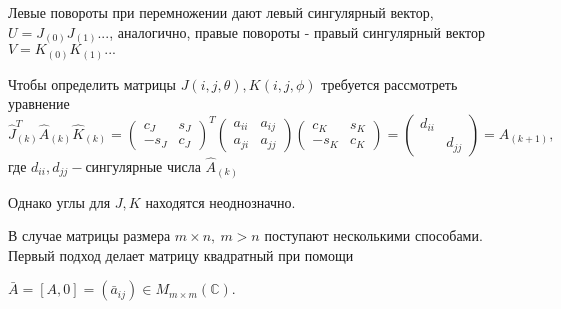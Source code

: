 Левые повороты при перемножении дают левый сингулярный вектор, $U=J_{(0)}J_{(1)}...$, аналогично, правые повороты - правый сингулярный вектор $V=K_{(0)}K_{(1)}...$

Чтобы определить матрицы $J(i,j,\theta), K(i,j,\phi)$ требуется рассмотреть уравнение
\begin{equation}
    \hat{J}_{(k)}^T\hat{A}_{(k)}\hat{K}_{(k)} = \begin{pmatrix}
        c_J&s_J\\
        -s_J&c_J
    \end{pmatrix}^T
    \begin{pmatrix}
        a_{ii}&a_{ij}\\
        a_{ji}&a_{jj}
    \end{pmatrix}
    \begin{pmatrix}
        c_K&s_K\\
        -s_K&c_K
    \end{pmatrix} = \begin{pmatrix}
        d_{ii} &\\
        &d_{jj}
    \end{pmatrix} = A_{(k+1)},
\end{equation}
где $d_{ii}, d_{jj} -\text{сингулярные числа } \hat{A}_{(k)}$

Однако углы для $J, K$ находятся неоднозначно.

В случае матрицы размера $m \times n, \ m>n$ поступают несколькими способами.
Первый подход делает матрицу квадратный при помощи
\begin{center}
    $\bar{A} = [A,0] =(\bar{a}_{ij})\in M_{m\times m}(\mathbb{C})$.
\end{center}

